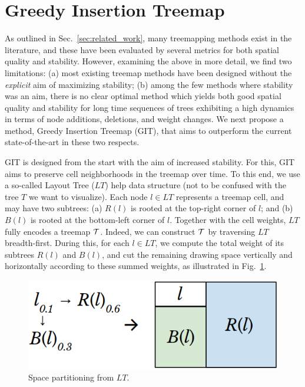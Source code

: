 \section{Greedy Insertion Treemap}
\label{sec:git}
%
As outlined in Sec.~\ref{sec:related_work}, many treemapping methods exist in the literature, and these have been evaluated by several metrics for both spatial quality and stability. However, examining the above in more detail, we find two limitations: (a) most existing treemap methods have been designed without the \emph{explicit} aim of maximizing stability; (b) among the few methods where stability was an aim, there is no clear optimal method which yields both good spatial quality and stability for long time sequences of trees exhibiting a high dynamics in terms of node additions, deletions, and weight changes. We next propose a method, Greedy Insertion Treemap (GIT), that aims to outperform the current state-of-the-art in these two respects.


GIT is designed from the start with the aim of increased stability. For this, GIT aims to preserve cell neighborhoods in the treemap over time. To this end, we use a so-called Layout Tree ($LT$) help data structure (not to be confused with the tree $T$ we want to visualize).
Each node $l \in LT$ represents a treemap cell, and may have two subtrees: (a) $R(l)$ is rooted at the top-right corner of $l$; and (b) $B(l)$ is rooted at the bottom-left corner of $l$. Together with the cell weights, $LT$ fully encodes a treemap ${\cal T}$. Indeed, we can construct ${\cal T}$ by traversing $LT$ breadth-first.
During this, for each $l \in LT$, we compute the total weight of its subtrees $R(l)$ and $B(l)$, and cut the remaining drawing space vertically and horizontally according to these summed weights, as illustrated in Fig.~\ref{fig:space-partition}.

\begin{figure}
\centering
\includegraphics[width=.8\textwidth]{figures/treemap-algorithm/space-partition.png}
\caption{Space partitioning from $LT$.}
\label{fig:space-partition}
\end{figure}

